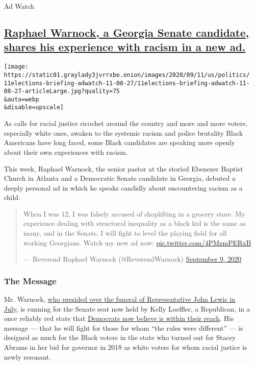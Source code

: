Ad Watch

\hypertarget{raphael-warnock-a-georgia-senate-candidate-shares-his-experience-with-racism-in-a-new-ad}{%
\subsection{\texorpdfstring{\protect\hyperlink{raphael-warnock-a-georgia-senate-candidate-shares-his-experience-with-racism-in-a-new-ad}{Raphael
Warnock, a Georgia Senate candidate, shares his experience with racism
in a new
ad.}}{Raphael Warnock, a Georgia Senate candidate, shares his experience with racism in a new ad.}}\label{raphael-warnock-a-georgia-senate-candidate-shares-his-experience-with-racism-in-a-new-ad}}

\texttt{[image: https://static01.graylady3jvrrxbe.onion/images/2020/09/11/us/politics/11elections-briefing-adwatch-11-08-27/11elections-briefing-adwatch-11-08-27-articleLarge.jpg?quality=75\\\&auto=webp\\\&disable=upscale]}

As calls for racial justice ricochet around the country and more and
more voters, especially white ones, awaken to the systemic racism and
police brutality Black Americans have long faced, some Black candidates
are speaking more openly about their own experiences with racism.

This week, Raphael Warnock, the senior pastor at the storied Ebenezer
Baptist Church in Atlanta and a Democratic Senate candidate in Georgia,
debuted a deeply personal ad in which he speaks candidly about
encountering racism as a child.

\begin{quote}
When I was 12, I was falsely accused of shoplifting in a grocery store.
My experience dealing with structural inequality as a black kid is the
same as many, and in the Senate, I will fight to level the playing field
for all working Georgians. Watch my new ad now:
\href{https://t.co/4PMzmPERxB}{pic.twitter.com/4PMzmPERxB}

--- Reverend Raphael Warnock (@ReverendWarnock)
\href{https://twitter.com/ReverendWarnock/status/1303660020446433282?ref_src=twsrc\%5Etfw}{September
9, 2020}
\end{quote}

\hypertarget{the-message}{%
\subsubsection{The Message}\label{the-message}}

Mr. Warnock,
\href{https://www.nytimes3xbfgragh.onion/2020/07/30/us/john-lewis-live-funeral.html}{who
presided over the funeral of Representative John Lewis in July}, is
running for the Senate seat now held by Kelly Loeffler, a Republican, in
a once reliably red state that
\href{https://www.nytimes3xbfgragh.onion/2020/06/09/us/politics/georgia-primary-election-senate-race-jon-ossoff.html}{Democrats
now believe is within their reach}. His message --- that he will fight
for those for whom ``the rules were different'' --- is designed as much
for the Black voters in the state who turned out for Stacey Abrams in
her bid for governor in 2018 as white voters for whom racial justice is
newly resonant.

